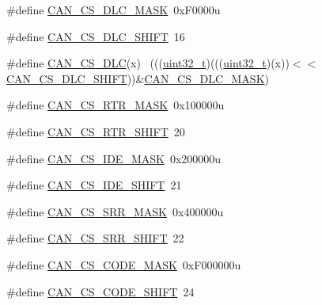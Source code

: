 \begin{DoxyCompactItemize}
\item 
\#define \hyperlink{group___c_a_n___register___masks_ga968a36f7478c9fad396ac64b5f1f18a2}{C\+A\+N\+\_\+\+C\+S\+\_\+\+D\+L\+C\+\_\+\+M\+A\+SK}~0x\+F0000u
\item 
\#define \hyperlink{group___c_a_n___register___masks_ga4e110f941e1580ad04b71b8ee68605ce}{C\+A\+N\+\_\+\+C\+S\+\_\+\+D\+L\+C\+\_\+\+S\+H\+I\+FT}~16
\item 
\#define \hyperlink{group___c_a_n___register___masks_ga98812d54e5e9e0221b4ad8729b2503d8}{C\+A\+N\+\_\+\+C\+S\+\_\+\+D\+LC}(x)                                                    ~(((\hyperlink{_p_e___types_8h_a33594304e786b158f3fb30289278f5af}{uint32\+\_\+t})(((\hyperlink{_p_e___types_8h_a33594304e786b158f3fb30289278f5af}{uint32\+\_\+t})(x))$<$$<$\hyperlink{group___c_a_n___register___masks_ga4e110f941e1580ad04b71b8ee68605ce}{C\+A\+N\+\_\+\+C\+S\+\_\+\+D\+L\+C\+\_\+\+S\+H\+I\+FT}))\&\hyperlink{group___c_a_n___register___masks_ga968a36f7478c9fad396ac64b5f1f18a2}{C\+A\+N\+\_\+\+C\+S\+\_\+\+D\+L\+C\+\_\+\+M\+A\+SK})
\item 
\#define \hyperlink{group___c_a_n___register___masks_ga64cd76de04f63c4e897feab93243a4d1}{C\+A\+N\+\_\+\+C\+S\+\_\+\+R\+T\+R\+\_\+\+M\+A\+SK}~0x100000u
\item 
\#define \hyperlink{group___c_a_n___register___masks_ga3298f7864757605895c4495c51d4f675}{C\+A\+N\+\_\+\+C\+S\+\_\+\+R\+T\+R\+\_\+\+S\+H\+I\+FT}~20
\item 
\#define \hyperlink{group___c_a_n___register___masks_ga8195b85087fd378777c67830ac2ca9fb}{C\+A\+N\+\_\+\+C\+S\+\_\+\+I\+D\+E\+\_\+\+M\+A\+SK}~0x200000u
\item 
\#define \hyperlink{group___c_a_n___register___masks_gae432768b4222f18cc1cec2b71ea8c579}{C\+A\+N\+\_\+\+C\+S\+\_\+\+I\+D\+E\+\_\+\+S\+H\+I\+FT}~21
\item 
\#define \hyperlink{group___c_a_n___register___masks_gafd71067968d03b95e1dae32dc18ac578}{C\+A\+N\+\_\+\+C\+S\+\_\+\+S\+R\+R\+\_\+\+M\+A\+SK}~0x400000u
\item 
\#define \hyperlink{group___c_a_n___register___masks_ga77681ba56144cadb15bce536a1fd016d}{C\+A\+N\+\_\+\+C\+S\+\_\+\+S\+R\+R\+\_\+\+S\+H\+I\+FT}~22
\item 
\#define \hyperlink{group___c_a_n___register___masks_gadff04787b30174d22d7955037c850b7c}{C\+A\+N\+\_\+\+C\+S\+\_\+\+C\+O\+D\+E\+\_\+\+M\+A\+SK}~0x\+F000000u
\item 
\#define \hyperlink{group___c_a_n___register___masks_ga58e7e6f814f9a6f5fa03974e3f4d7e34}{C\+A\+N\+\_\+\+C\+S\+\_\+\+C\+O\+D\+E\+\_\+\+S\+H\+I\+FT}~24
$$
\end{DoxyCompactItemize}
